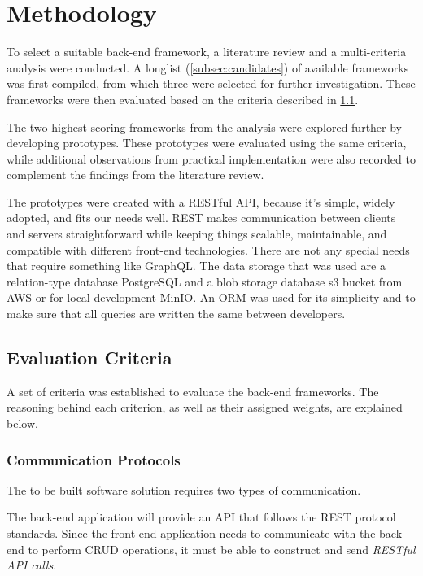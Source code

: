 \section{Methodology}
To select a suitable back-end framework, a literature review and a multi-criteria analysis were conducted.
A longlist (\cref{subsec:candidates}) of available frameworks was first compiled, from which three were selected for further investigation.
These frameworks were then evaluated based on the criteria described in \cref{subsec:criteria}.

The two highest-scoring frameworks from the analysis were explored further by developing prototypes.
These prototypes were evaluated using the same criteria, while additional observations from practical implementation were also recorded to complement the findings from the literature review.

The prototypes were created with a RESTful API, because it's simple, widely adopted, and fits our needs well.
REST makes communication between clients and servers straightforward while keeping things scalable, maintainable, and compatible with different front-end technologies.
There are not any special needs that require something like GraphQL. The data storage that was used are a relation-type database PostgreSQL and a blob storage database s3 bucket from AWS or for local development MinIO.
An ORM was used for its simplicity and to make sure that all queries are written the same between developers.

\subsection{Evaluation Criteria}\label{subsec:criteria}
A set of criteria was established to evaluate the back-end frameworks.
The reasoning behind each criterion, as well as their assigned weights, are explained below.

\subsubsection{Communication Protocols}\label{subsubsec:communication-protocols}
The to be built software solution requires two types of communication.

The back-end application will provide an API that follows the REST protocol standards.
Since the front-end application needs to communicate with the back-end to perform CRUD operations, it must be able to construct and send \emph{RESTful API calls}.

